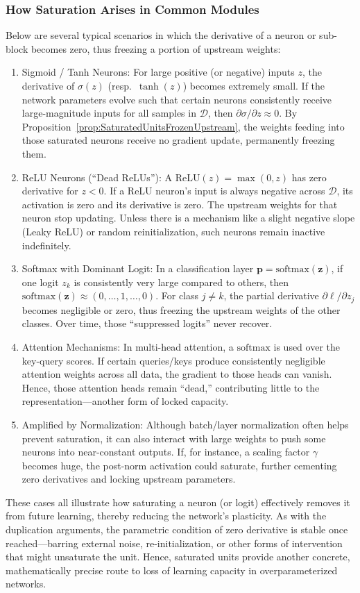 \documentclass[11pt]{article}
\begin{document}
\subsubsection{How Saturation Arises in Common Modules}
Below are several typical scenarios in which the derivative of a neuron or sub-block becomes zero, thus freezing a portion of upstream weights:
\begin{enumerate}
    \item Sigmoid / Tanh Neurons: For large positive (or negative) inputs $z$, the derivative of $\sigma(z)$ (resp.\ $\tanh(z)$) becomes extremely small. If the network parameters evolve such that certain neurons consistently receive large-magnitude inputs for all samples in $\mathcal{D}$, then $\partial \sigma/\partial z \approx 0$. By Proposition~\ref{prop:SaturatedUnitsFrozenUpstream}, the weights feeding into those saturated neurons receive no gradient update, permanently freezing them.
    \item ReLU Neurons (``Dead ReLUs''): A $\mathrm{ReLU}(z)=\max(0,z)$ has zero derivative for $z<0$. If a ReLU neuron's input is always negative across $\mathcal{D}$, its activation is zero and its derivative is zero. The upstream weights for that neuron stop updating. Unless there is a mechanism like a slight negative slope (Leaky ReLU) or random reinitialization, such neurons remain inactive indefinitely.
    \item Softmax with Dominant Logit: In a classification layer $\mathbf{p}=\mathrm{softmax}(\mathbf{z})$, if one logit $z_k$ is consistently very large compared to others, then $\mathrm{softmax}(\mathbf{z})\approx(0,\dots,1,\dots,0)$. For class $j\neq k$, the partial derivative $\partial \ell/\partial z_j$ becomes negligible or zero, thus freezing the upstream weights of the other classes. Over time, those ``suppressed logits'' never recover.
    \item Attention Mechanisms: In multi-head attention, a $\mathrm{softmax}$ is used over the key-query scores. If certain queries/keys produce consistently negligible attention weights across all data, the gradient to those heads can vanish. Hence, those attention heads remain ``dead,'' contributing little to the representation---another form of locked capacity.
    \item Amplified by Normalization: Although batch/layer normalization often helps prevent saturation, it can also interact with large weights to push some neurons into near-constant outputs. If, for instance, a scaling factor $\gamma$ becomes huge, the post-norm activation could saturate, further cementing zero derivatives and locking upstream parameters.
\end{enumerate}
These cases all illustrate how saturating a neuron (or logit) effectively removes it from future learning, thereby reducing the network's plasticity. As with the duplication arguments, the parametric condition of zero derivative is stable once reached---barring external noise, re-initialization, or other forms of intervention that might unsaturate the unit. Hence, saturated units provide another concrete, mathematically precise route to loss of learning capacity in overparameterized networks.
\end{document}
